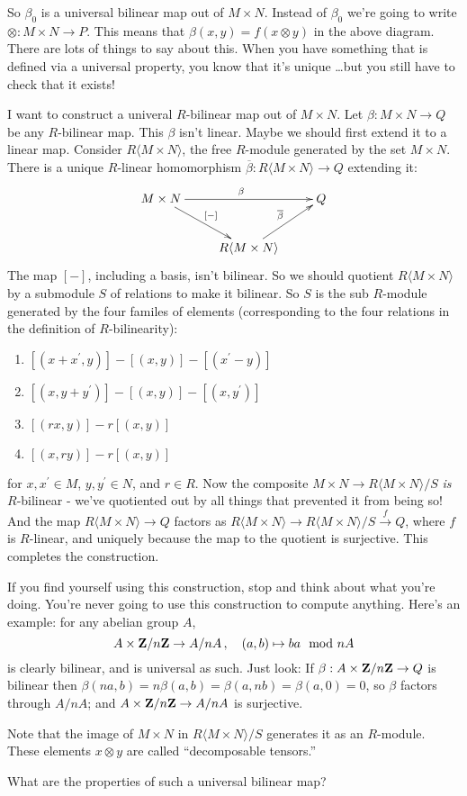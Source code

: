So $\beta_0$ is a universal bilinear map out of $M\times N$. Instead of $\beta_0$ we're going to write $\otimes:M\times N\rightarrow P$. This means that $\beta(x,y)=f(x\otimes y)$ in the above diagram. There are lots of things to say about this. When you have something that is defined via a universal property, you know that it's unique \ldots but you still have to check that it exists!
\begin{construction}
I want to construct a univeral $R$-bilinear map out of $M\times N$. Let $\beta:M\times N\to Q$ be any $R$-bilinear map. This $\beta$ isn't linear. Maybe we should first extend it to a linear map. Consider $R\langle M\times N\rangle$, the free $R$-module generated by the set $M\times N$. There is a unique $R$-linear homomorphism $\overline{\beta}:R\langle M\times N\rangle\to Q$ extending it:
\begin{equation*}
\xymatrix{M\times N\ar[rr]^\beta\ar[dr]^{[-]} & & Q\\
& R\langle M\times N\rangle\ar[ur]^{\overline{\beta}} &}
\end{equation*}
The map $[-]$, including a basis, isn't bilinear. So we should quotient $R\langle M\times N\rangle$ by a submodule $S$ of relations to make it bilinear. So $S$ is the sub $R$-module generated by the four familes of elements (corresponding to the four relations in the definition of $R$-bilinearity): 
\begin{enumerate}
\item $[(x+x^\prime,y)]-[(x,y)]-[(x^\prime-y)]$
\item $[(x,y+y^\prime)]-[(x,y)]-[(x,y^\prime)]$
\item $[(rx,y)]-r[(x,y)]$
\item $[(x,ry)]-r[(x,y)]$
\end{enumerate}
for $x,x^\prime\in M$, $y,y^\prime\in N$, and $r\in R$. Now the composite
$M\times N\to R\langle M\times N\rangle/S$ {\em is} $R$-bilinear - we've quotiented out by all things that prevented it from being so! And the map $R\langle M\times N\rangle\to Q$ factors as $R\langle M\times N\rangle\to R\langle M\times N\rangle/S\xrightarrow{f} Q$, where $f$ is $R$-linear, and uniquely because the map to the quotient is surjective. This completes the construction.
\end{construction}

If you find yourself using this construction, stop and think about what you're doing. You're never going to use this construction to compute anything. 
Here's an example: for any abelian group $A$, 
\[
A\times \mathbf Z/n\mathbf Z\to A/nA\,,\quad (a,b)\mapsto ba\mod nA
\]
is clearly bilinear, and is universal as such. Just look: If 
$\beta:A\times\mathbf Z/n\mathbf Z\to Q$ is bilinear then 
$\beta(na,b)=n\beta(a,b)=\beta(a,nb)=\beta(a,0)=0$, so $\beta$ factors through 
$A/nA$; and $A\times\mathbf Z/n\mathbf Z\to A/nA$ is surjective.
\begin{remark}
Note that the image of $M\times N$ in $R\langle M\times N\rangle/S$ generates it as an $R$-module. These elements $x\otimes y$ are called ``decomposable tensors.'' 
\end{remark}
What are the properties of such a universal bilinear map? 

